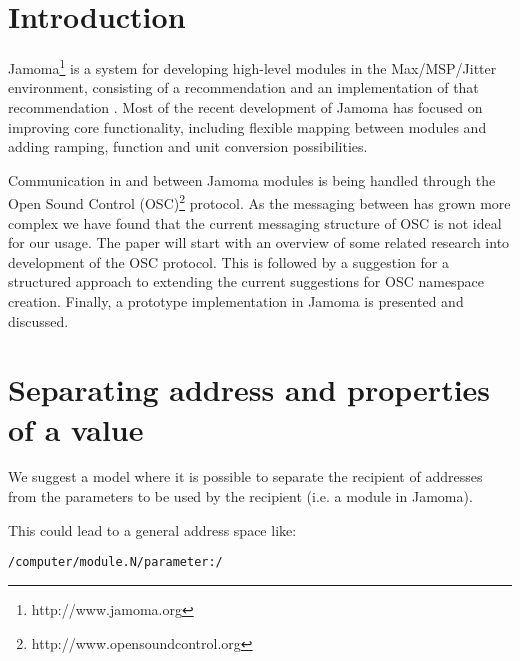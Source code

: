 \documentclass{sig-alternate}
\begin{document}




\section{Introduction} %
\label{sec:introduction}

Jamoma\footnote{http://www.jamoma.org} is a system for developing high-level modules in the Max/MSP/Jitter environment, consisting of a recommendation and an implementation of that recommendation  \cite{Place:2006}. Most of the recent development of Jamoma has focused on improving core functionality, including flexible mapping between modules and adding ramping, function and unit conversion possibilities. 

Communication in and between Jamoma modules is being handled through the Open Sound Control (OSC)\footnote{http://www.opensoundcontrol.org} protocol. As the messaging between has grown more complex we have found that the current messaging structure of OSC is not ideal for our usage. The paper will start with an overview of some related research into development of the OSC protocol. This is followed by a suggestion for a structured approach to extending the current suggestions for OSC namespace creation. Finally, a prototype implementation in Jamoma is presented and discussed.






\section{Separating address and properties of a value} %
\label{sec:address_and_properites_of_a_value}



We suggest a model where it is possible to separate the recipient of addresses from the parameters to be used by the recipient (i.e. a module in Jamoma). 

This could lead to a general address space like: 

\begin{small}
\begin{verbatim}
/computer/module.N/parameter:/
\end{verbatim}
\end{small}
\end{document}
